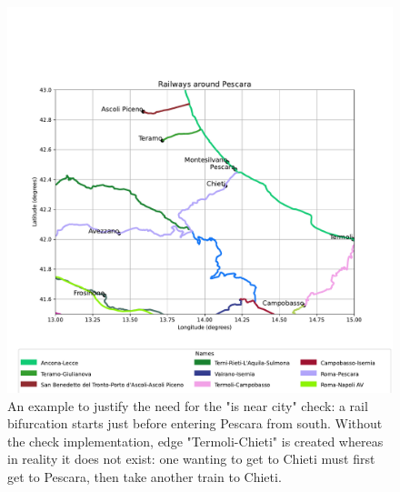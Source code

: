 \begin{figure}[H]
    \centering
    \includegraphics[width= \textwidth]{latex_source/images/railways/pescara_area.pdf}
    \caption{An example to justify the need for the "is near city" check: a rail bifurcation starts just before entering Pescara from south. Without the check implementation, edge "Termoli-Chieti" is created whereas in reality it does not exist: one wanting to get to Chieti must first get to Pescara, then take another train to Chieti. }
    \label{fig:pescara_area}
\end{figure}
\newpage
